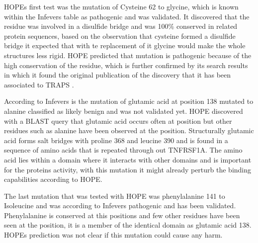 	HOPEs first test was the mutation of Cysteine 62 to glycine, which is known within the Infevers table as pathogenic and was validated. 
	It discovered that the residue was involved in a disulfide bridge and was 100\% conserved in related protein sequences, based on the observation that cysteine formed a disulfide bridge it expected that with te replacement of it glycine would make the whole structures less rigid. 
	HOPE predicted that mutation is pathogenic because of the high conservation of the residue, which is further confirmed by its search results in which it found the original publication of the discovery that it has been associated to TRAPS \cite{aksentijevich_tumor-necrosis-factor_2001}.
	
	According to Infevers is the mutation of glutamic acid at position 138 mutated to alanine classified as likely benign and was not validated yet. HOPE discovered with a BLAST query that glutamic acid occurs often at position but other residues such as alanine have been observed at the position. Structurally glutamic acid forms salt bridges with proline  368 and leucine 390 and is found in a sequence of amino acids that is repeated through out TNFRSF1A. The amino acid lies within a domain where it interacts with other domains and is important for the proteins activity, with this mutation it might already perturb the binding capabilities according to HOPE.
	
	The last mutation that was tested with HOPE was phenylalanine 141 to Isoleucine and was according to Infevers pathogenic and has been validated. Phenylalanine is conserved at this positions and few other residues have been seen at the position, it is a member of the identical domain as glutamic acid 138. HOPEs prediction was not clear if this mutation could cause any harm.
	
